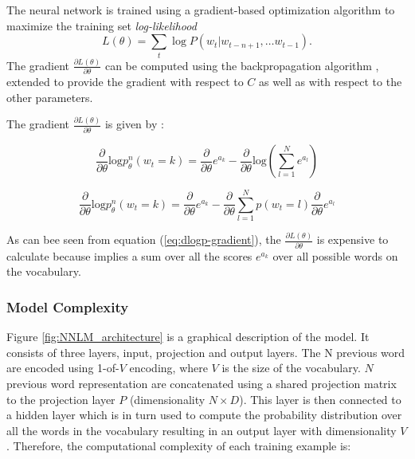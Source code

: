 The neural network is trained using a gradient-based optimization algorithm
to maximize the training set \textit{log-likelihood}
\begin{equation}
 L(\theta) = \sum_t \log P(w_t | w_{t-n+1}, \ldots w_{t-1}) .
\end{equation}
The gradient $\frac{\partial L(\theta)}{\partial \theta}$
can be computed using the backpropagation algorithm \cite{Bishop:1995:NNP:525960}, extended
to provide the gradient with respect to $C$ as well as with
respect to the other parameters. 



The gradient   $\frac{\partial L(\theta)}{\partial
  \theta}$   is given by  :



\begin{equation*}
  \label{eq:nnlm-grad}
  \frac{\partial }{\partial \theta}\text{log}p_{\theta}^{n}(w_t=k) =
  \frac{\partial }{\partial \theta} e^{a_k} -  \frac{\partial }{\partial
    \theta}\text{log} \left( \sum_{l=1}^N e^{a_l} \right)
 \end{equation*}

\begin{equation}
\label{eq:dlogp-gradient}
  \frac{\partial }{\partial \theta}\text{log}p_{\theta}^{n}(w_t=k)  =  \frac{\partial }{\partial \theta} e^{a_k}  -   \frac{\partial }{\partial
    \theta}  \sum_{l=1}^N  p(w_t = l)  \frac{\partial }{\partial
    \theta}  e^{a_l}   
\end{equation}


As can bee seen from equation (\ref{eq:dlogp-gradient}), the  $\frac{\partial L(\theta)}{\partial
  \theta}$ is  expensive to calculate because implies a sum over all the scores $e^{a_{k}}$ over all possible words on the vocabulary.


\subsubsection{Model Complexity}
\label{sec:sub:sub:bengio_nnlm_complexity}

Figure \ref{fig:NNLM_architecture} is a graphical description of  the model.
It consists of three layers, input, projection and output layers. The N
previous word are encoded using 1-of-$V$ encoding, where $V$ is the size
of the vocabulary. $N$ previous word representation are concatenated using a
shared projection matrix to the projection layer $P$ (dimensionality $N
\times D$).  This layer is then connected to a hidden layer which is in turn
used to compute the probability distribution over all the words in the
vocabulary resulting in an output layer with dimensionality $V$. Therefore,
the computational complexity of each training example is:

